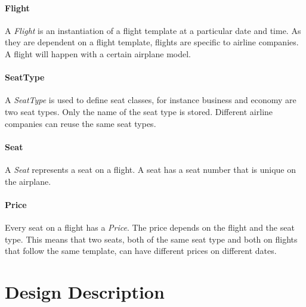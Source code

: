 \documentclass[a4paper]{article}
\newcommand{\field}[1]{\emph{#1}}
\begin{document}


\paragraph{Flight}
A \field{Flight} is an instantiation of a flight template at a particular date and time.
As they are dependent on a flight template, flights are specific to airline companies.
A flight will happen with a certain airplane model.
\paragraph{SeatType}
A \field{SeatType} is used to define seat classes, for instance business and economy are two seat types.
Only the name of the seat type is stored.
Different airline companies can reuse the same seat types.
\paragraph{Seat}
A \field{Seat} represents a seat on a flight.
A seat has a seat number that is unique on the airplane.
\paragraph{Price}
Every seat on a flight has a \field{Price}.
The price depends on the flight and the seat type.
This means that two seats, both of the same seat type and both on flights that follow the same template, can have different prices on different dates.


\clearpage
\section{Design Description}
\label{sec:design-description}


\end{document}
